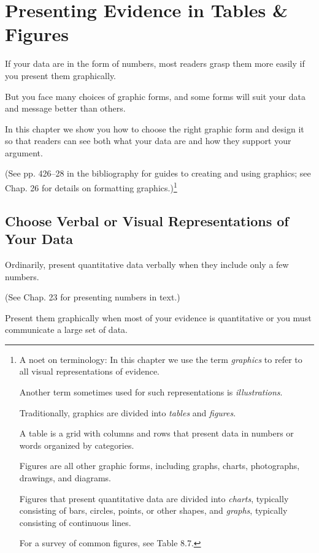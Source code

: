 \documentclass[oneside]{book}
\numberwithin{equation}{section}
\begin{document}

\chapter{Presenting Evidence in Tables \& Figures}

If your data are in the form of numbers, most readers grasp them more easily if you present them graphically.

But you face many choices of graphic forms, and some forms will suit your data and message better than others.

In this chapter we show you how to choose the right graphic form and design it so that readers can see both what your data are and how they support your argument.

(See pp. 426--28 in the bibliography for guides to creating and using graphics; see Chap. 26 for details on formatting graphics.)\footnote{A noet on terminology: In this chapter we use the term \textit{graphics} to refer to all visual representations of evidence.

Another term sometimes used for such representations is \textit{illustrations}.

Traditionally, graphics are divided into \textit{tables} and \textit{figures}.

A table is a grid with columns and rows that present data in numbers or words organized by categories.

Figures are all other graphic forms, including graphs, charts, photographs, drawings, and diagrams.

Figures that present quantitative data are divided into \textit{charts}, typically consisting of bars, circles, points, or other shapes, and \textit{graphs}, typically consisting of continuous lines.

For a survey of common figures, see Table 8.7.}

\section{Choose Verbal or Visual Representations of Your Data}
Ordinarily, present quantitative data verbally when they include only a few numbers.

(See Chap. 23 for presenting numbers in text.)

Present them graphically when most of your evidence is quantitative or you must communicate a large set of data.
\end{document}
